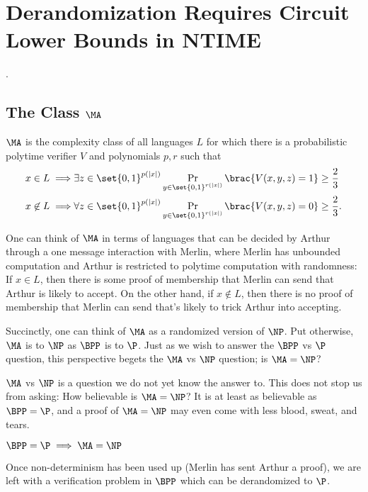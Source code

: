 \chapter{Derandomization Requires Circuit Lower Bounds in NTIME}\label{lec:11}

.

\section[\texorpdfstring{The Class $\MA$}{The Class MA}]{The Class $\MA$}

\begin{definition}[$\MA$]
  $\MA$ is the complexity class of all languages $L$ for which there is a 
  probabilistic polytime verifier $V$ and polynomials $p,r$ such that
  \begin{align*}
      x \in L \implies &
      \exists z \in \set{0,1}^{p(|x|)} \Pr_{y \in \set{0,1}^{r(|x|)}} \brac{V(x,y,z) = 1} \ge \frac{2}{3}
      \\
      x \not\in L \implies &
      \forall z \in \set{0,1}^{p(|x|)} \Pr_{y \in \set{0,1}^{r(|x|)}} \brac{V(x,y,z) = 0} \ge \frac{2}{3}.
  \end{align*}
\end{definition}

One can think of $\MA$ in terms of languages that can be decided by Arthur 
through a one message interaction with Merlin, where Merlin has unbounded 
computation and Arthur is restricted to polytime computation with randomness:
If $x \in L$, then there is some proof of membership that Merlin can send that 
Arthur is likely to accept.
On the other hand, if $x \not\in L$, then there is no proof of membership that 
Merlin can send that's likely to trick Arthur into accepting.

Succinctly, one can think of $\MA$ as a randomized version of $\NP$.
Put otherwise, $\MA$ is to $\NP$ as $\BPP$ is to $\P$.
Just as we wish to answer the $\BPP$ vs $\P$ question, this perspective begets 
the $\MA$ vs $\NP$ question; is $\MA = \NP$?

$\MA$ vs $\NP$ is a question we do not yet know the answer to.
This does not stop us from asking:
How believable is $\MA = \NP$?
It is at least as believable as $\BPP = \P$, and a proof of $\MA = \NP$ may 
even come with less blood, sweat, and tears.
\begin{lemma}\label{lem:manp-ez}
  $\BPP = \P \implies \MA = \NP$
\end{lemma}
\begin{proofsk}
  Once non-determinism has been used up (Merlin has sent Arthur a proof), we 
  are left with a verification problem in $\BPP$ which can be derandomized to 
  $\P$.
\end{proofsk}

